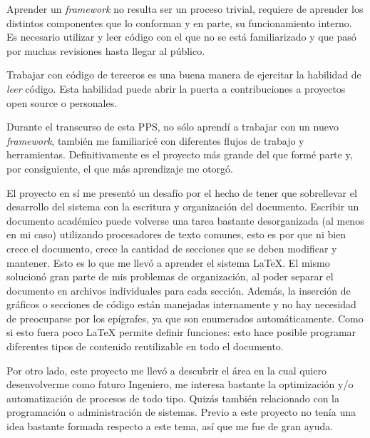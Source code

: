 Aprender un \textit{framework} no resulta ser un proceso trivial, requiere de aprender los
distintos componentes que lo conforman y en parte, su funcionamiento interno\@. Es necesario
utilizar y leer código con el que no se está familiarizado y que pasó por muchas revisiones
hasta llegar al público.

Trabajar con código de terceros es una buena manera de ejercitar la habilidad de \textit{leer}
código\@. Esta habilidad puede abrir la puerta a contribuciones a proyectos open source o
personales.

Durante el transcurso de esta PPS, no sólo aprendí a trabajar con un nuevo \textit{framework},
también me familiaricé con diferentes flujos de trabajo y herramientas\@. Definitivamente es
el proyecto más grande del que formé parte y, por consiguiente, el que más aprendizaje me otorgó.

El proyecto en sí me presentó un desafío por el hecho de tener que sobrellevar el desarrollo
del sistema con la escritura y organización del documento\@. Escribir un documento académico
puede volverse una tarea bastante desorganizada (al menos en mi caso) utilizando procesadores
de texto comunes, esto es por que ni bien crece el documento, crece la cantidad de secciones
que se deben modificar y mantener\@. Esto es lo que me llevó a aprender el sistema {\LaTeX}\@.
El mismo solucionó gran parte de mis problemas de organización, al poder
separar el documento en archivos individuales para cada sección\@. Además, la inserción de
gráficos o secciones de código están manejadas internamente y no hay necesidad de
preocuparse por los
epígrafes, ya que son enumerados automáticamente\@. Como si esto fuera poco {\LaTeX} permite
definir funciones: esto hace posible programar diferentes tipos de contenido reutilizable en todo el
documento.


Por otro lado, este proyecto me llevó a descubrir el área en la cual quiero desenvolverme como
futuro Ingeniero, me interesa bastante la optimización y/o automatización de procesos de todo
tipo. Quizás también relacionado con la programación o administración de sistemas\@. Previo a
este proyecto no tenía una idea bastante formada respecto a este tema, así que me fue de gran
ayuda.\newline


